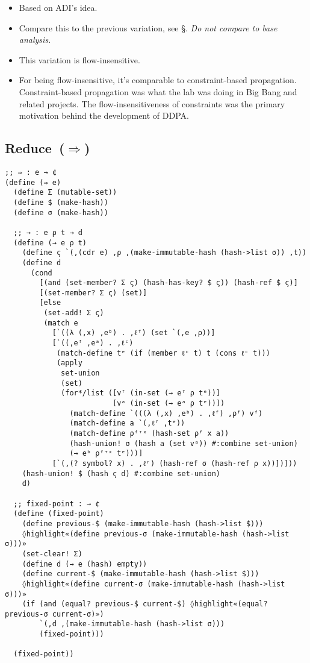 \documentclass[12pt, oneside]{book}
\begin{document}
\begin{itemize}
  \item Based on ADI’s idea.
  \item Compare this to the previous variation, see §. \emph{Do not compare to base analysis.}
  \item This variation is flow-insensitive.
  \item For being flow-insensitive, it’s comparable to constraint-based propagation. Constraint-based propagation was what the lab was doing in Big Bang and related projects. The flow-insensitiveness of constraints was the primary motivation behind the development of DDPA.
\end{itemize}

\subsection{Reduce~(\(⇒\))}

\begin{Verbatim}
;; ⇒ : e → ¢
(define (⇒ e)
  (define Σ (mutable-set))
  (define $ (make-hash))
  (define σ (make-hash))

  ;; → : e ρ t → d
  (define (→ e ρ t)
    (define ς `(,(cdr e) ,ρ ,(make-immutable-hash (hash->list σ)) ,t))
    (define d
      (cond
        [(and (set-member? Σ ς) (hash-has-key? $ ς)) (hash-ref $ ς)]
        [(set-member? Σ ς) (set)]
        [else
         (set-add! Σ ς)
         (match e
           [`((λ (,x) ,eᵇ) . ,ℓᶠ) (set `(,e ,ρ))]
           [`((,eᶠ ,eᵃ) . ,ℓᶜ)
            (match-define tᵉ (if (member ℓᶜ t) t (cons ℓᶜ t)))
            (apply
             set-union
             (set)
             (for*/list ([vᶠ (in-set (→ eᶠ ρ tᵉ))]
                         [vᵃ (in-set (→ eᵃ ρ tᵉ))])
               (match-define `(((λ (,x) ,eᵇ) . ,ℓᶠ) ,ρᶠ) vᶠ)
               (match-define a `(,ℓᶠ ,tᵉ))
               (match-define ρᶠ⁺ˣ (hash-set ρᶠ x a))
               (hash-union! σ (hash a (set vᵃ)) #:combine set-union)
               (→ eᵇ ρᶠ⁺ˣ tᵉ)))]
           [`(,(? symbol? x) . ,ℓʳ) (hash-ref σ (hash-ref ρ x))])]))
    (hash-union! $ (hash ς d) #:combine set-union)
    d)

  ;; fixed-point : → ¢
  (define (fixed-point)
    (define previous-$ (make-immutable-hash (hash->list $)))
    ◊highlight«(define previous-σ (make-immutable-hash (hash->list σ)))»
    (set-clear! Σ)
    (define d (→ e (hash) empty))
    (define current-$ (make-immutable-hash (hash->list $)))
    ◊highlight«(define current-σ (make-immutable-hash (hash->list σ)))»
    (if (and (equal? previous-$ current-$) ◊highlight«(equal? previous-σ current-σ)»)
        `(,d ,(make-immutable-hash (hash->list σ)))
        (fixed-point)))

  (fixed-point))
\end{Verbatim}
\end{document}
